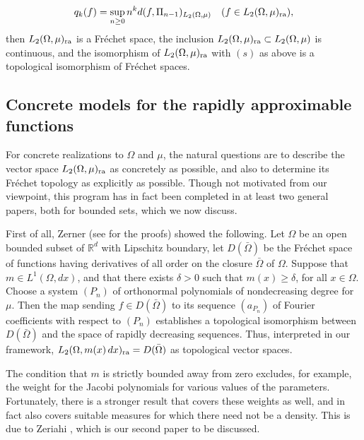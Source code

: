 \documentclass[12pt, reqno]{amsart}
\numberwithin{equation}{section}
\theoremstyle{plain}
\theoremstyle{definition}
\begin{document}
\begin{equation*}
q_k(f)=\sup_{n\geq 0} n^k d(f,\Pi_{n-1})_{L_2(\Omega,\mu)}\quad(f\in L_2(\Omega, \mu)_{\textup{ra}}),
\end{equation*}
then $L_2(\Omega, \mu)_{\textup{ra}}$ is a Fr\'echet space, the inclusion $L_2(\Omega, \mu)_{\textup{ra}}\subset L_2(\Omega,\mu)$ is continuous, and the isomorphism of  $L_2(\Omega, \mu)_{\textup{ra}}$ with $(s)$ as above is a topological isomorphism of Fr\'echet spaces.

\subsection{Concrete models for the rapidly approximable functions}\label{subsec:concretemodels}
For concrete realizations to $\Omega$ and $\mu$, the natural questions are to describe the vector space $L_2(\Omega,\mu)_{\textup{ra}}$ as concretely as possible, and also to determine its Fr\'echet topology as explicitly as possible. Though not motivated from our viewpoint, this program has in fact been completed in at least two general papers, both for bounded sets, which we now discuss.

First of all, Zerner \cite{Zerner} (see \cite{Pavec} for the proofs) showed the following. Let $\Omega$ be an open bounded subset of ${{\mathbb R}}^d$ with Lipschitz boundary, let $D(\bar{\Omega})$ be the Fr\'{e}chet space of functions having derivatives of all order on the closure $\bar{\Omega}$ of $\Omega$. Suppose that $m\in L^{1}(\Omega,dx)$, and that there exists $\delta>0$ such that $m(x)\geq \delta$, for all $x\in \Omega$. Choose a system ${({P_n})}$ of orthonormal polynomials of nondecreasing degree for $\mu$. Then the map sending $f\in D(\bar{\Omega})$ to its sequence ${({a_{P_n}})}$ of Fourier coefficients with respect to ${({P_n})}$ establishes a topological isomorphism between $D(\bar{\Omega})$ and the space of rapidly decreasing sequences. Thus, interpreted in our framework, $L_2(\Omega, m(x)\,dx)_{\textup{ra}}=D(\bar{\Omega})$ as topological vector spaces.

The condition that $m$ is strictly bounded away from zero excludes, for example, the weight for the Jacobi polynomials for various values of the parameters. Fortunately, there is a stronger result that covers these weights as well, and in fact also covers suitable measures for which there need not be a density. This is due to Zeriahi \cite{Zeriahi}, which is our second paper to be discussed.
\end{document}
